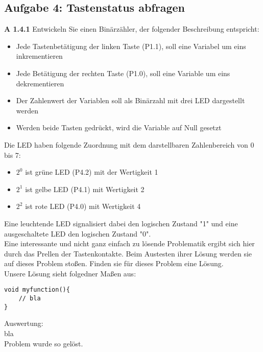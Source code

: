 \subsection*{Aufgabe 4: Tastenstatus abfragen}

\textbf{A 1.4.1} Entwickeln Sie einen Binärzähler, der folgender Beschreibung entspricht:

\begin{itemize}

\item Jede Tastenbetätigung der linken Taste (P1.1), soll eine Variabel um eins inkrementieren
\item Jede Betätigung der rechten Taste (P1.0), soll eine Variable um eins dekrementieren
\item Der Zahlenwert der Variablen soll als Binärzahl mit drei LED dargestellt werden
\item Werden beide Tasten gedrückt, wird die Variable auf Null gesetzt

\end{itemize}

\vspace{\baselineskip}

Die LED haben folgende Zuordnung mit dem darstellbaren Zahlenbereich von 0 bis 7:

\begin{itemize}
\item $2^0$ ist grüne LED (P4.2) mit der Wertigkeit 1
\item $2^1$ ist gelbe LED (P4.1) mit Wertigkeit 2
\item $2^2$ ist rote LED (P4.0) mit Wertigkeit 4
\end{itemize}

\vspace{\baselineskip}

Eine leuchtende LED signalisiert dabei den logischen Zustand "1" und eine ausgeschaltete LED den logischen Zustand "0".\\

Eine interessante und nicht ganz einfach zu lösende Problematik ergibt sich hier durch das Prellen der Tastenkontakte. Beim Austesten ihrer Lösung werden sie auf dieses Problem stoßen. Finden sie für dieses Problem eine Lösung. \\

Unsere Lösung sieht folgedner Maßen aus:

\begin{lstlisting}
void myfunction(){
	// bla
}
\end{lstlisting}

Auswertung:\\

bla\\

Problem wurde so gelöst.